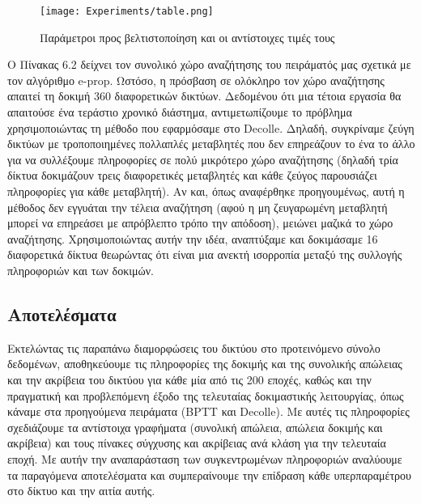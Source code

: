 \documentclass[12pt]{report}
\begin{document}
\begin{figure}[htp] %
    \centering
     \texttt{[image: Experiments/table.png]}
    \caption{Παράμετροι προς βελτιστοποίηση και οι αντίστοιχες τιμές τους}
    \label{fig:representation-methods}
\end{figure}

Ο Πίνακας 6.2 δείχνει τον συνολικό χώρο αναζήτησης του πειράματός μας σχετικά με τον αλγόριθμο \textlatin{e-prop}. Ωστόσο, η πρόσβαση σε ολόκληρο τον χώρο αναζήτησης απαιτεί τη δοκιμή 360 διαφορετικών δικτύων. Δεδομένου ότι μια τέτοια εργασία θα απαιτούσε ένα τεράστιο χρονικό διάστημα, αντιμετωπίζουμε το πρόβλημα χρησιμοποιώντας τη μέθοδο που εφαρμόσαμε στο \textlatin{Decolle}. Δηλαδή, συγκρίναμε ζεύγη δικτύων με τροποποιημένες πολλαπλές μεταβλητές που δεν επηρεάζουν το ένα το άλλο για να συλλέξουμε πληροφορίες σε πολύ μικρότερο χώρο αναζήτησης (δηλαδή τρία δίκτυα δοκιμάζουν τρεις διαφορετικές μεταβλητές και κάθε ζεύγος παρουσιάζει πληροφορίες για κάθε μεταβλητή). Αν και, όπως αναφέρθηκε προηγουμένως, αυτή η μέθοδος δεν εγγυάται την τέλεια αναζήτηση (αφού η μη ζευγαρωμένη μεταβλητή μπορεί να επηρεάσει με απρόβλεπτο τρόπο την απόδοση), μειώνει μαζικά το χώρο αναζήτησης. Χρησιμοποιώντας αυτήν την ιδέα, αναπτύξαμε και δοκιμάσαμε 16 διαφορετικά δίκτυα θεωρώντας ότι είναι μια ανεκτή ισορροπία μεταξύ της συλλογής πληροφοριών και των δοκιμών.

\subsection{Αποτελέσματα}

Εκτελώντας τις παραπάνω διαμορφώσεις του δικτύου στο προτεινόμενο σύνολο δεδομένων, αποθηκεύουμε τις πληροφορίες της δοκιμής και της συνολικής απώλειας και την ακρίβεια του δικτύου για κάθε μία από τις 200 εποχές, καθώς και την πραγματική και προβλεπόμενη έξοδο της τελευταίας δοκιμαστικής λειτουργίας, όπως κάναμε στα προηγούμενα πειράματα (\textlatin{BPTT} και \textlatin{Decolle}). Με αυτές τις πληροφορίες σχεδιάζουμε τα αντίστοιχα γραφήματα (συνολική απώλεια, απώλεια δοκιμής και ακρίβεια) και τους πίνακες σύγχυσης και ακρίβειας ανά κλάση για την τελευταία εποχή. Με αυτήν την αναπαράσταση των συγκεντρωμένων πληροφοριών αναλύουμε τα παραγόμενα αποτελέσματα και συμπεραίνουμε την επίδραση κάθε υπερπαραμέτρου στο δίκτυο και την αιτία αυτής.
\end{document}
